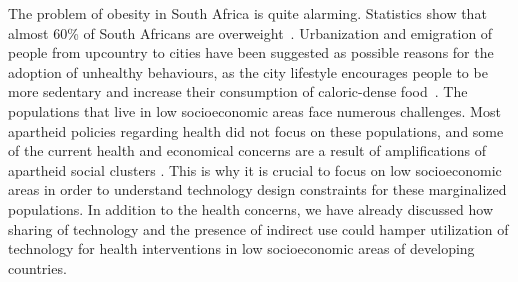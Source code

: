 The problem of obesity in South Africa is quite alarming. Statistics show that almost 60\% of South Africans are overweight~\citep{ng:global}. Urbanization and emigration of people from upcountry to cities  have been suggested as possible reasons for the adoption of unhealthy behaviours, as the city lifestyle encourages people to be more sedentary and increase their consumption of caloric-dense food~\citep{ali2009factors}. The populations that live in low socioeconomic areas face numerous challenges. Most apartheid policies regarding health did not focus on these populations, and some of the current health and economical concerns are a result of amplifications of apartheid social clusters \citep{benatar2013challenges}. This is why it is crucial to focus on low socioeconomic areas in order to understand technology design constraints for these marginalized populations. In addition to the health concerns, we have already discussed how sharing of technology and the presence of indirect use could hamper utilization of technology for health interventions in low socioeconomic areas of developing countries.   
\begin{flushright}
\end{flushright}
